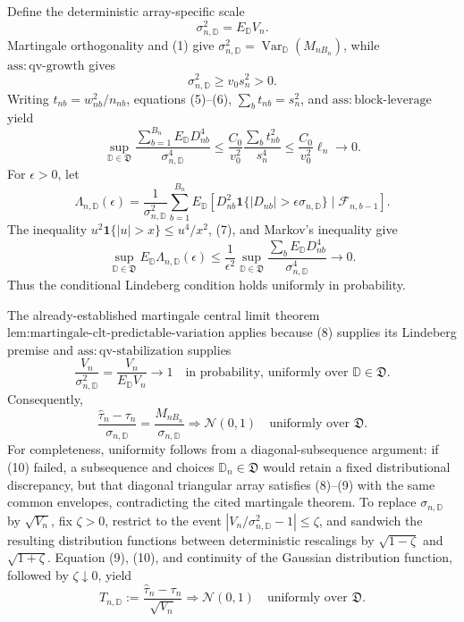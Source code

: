 Define the deterministic array-specific scale
\[
\sigma_{n,\mathbb D}^2=E_{\mathbb D}V_n.
\]
Martingale orthogonality and (1) give \(\sigma_{n,\mathbb D}^2=\operatorname{Var}_{\mathbb D}(M_{nB_n})\), while \(\mathrm{ass:qv\text{-}growth}\) gives
\[
\sigma_{n,\mathbb D}^2\ge v_0s_n^2>0. \tag{6}
\]
Writing \(t_{nb}=w_{nb}^2/n_{nb}\), equations (5)--(6), \(\sum_bt_{nb}=s_n^2\), and \(\mathrm{ass:block\text{-}leverage}\) yield
\[
\sup_{\mathbb D\in\mathfrak D}
\frac{\sum_{b=1}^{B_n}E_{\mathbb D}D_{nb}^4}{\sigma_{n,\mathbb D}^4}
\le\frac{C_0}{v_0^2}
\frac{\sum_bt_{nb}^2}{s_n^4}
\le\frac{C_0}{v_0^2}\ell_n\longrightarrow0. \tag{7}
\]
For \(\epsilon>0\), let
\[
\Lambda_{n,\mathbb D}(\epsilon)
=\frac1{\sigma_{n,\mathbb D}^2}\sum_{b=1}^{B_n}
E_{\mathbb D}\left[D_{nb}^2\mathbf 1\{|D_{nb}|>\epsilon\sigma_{n,\mathbb D}\}
\mid\mathcal F_{n,b-1}\right].
\]
The inequality \(u^2\mathbf 1\{|u|>x\}\le u^4/x^2\), (7), and Markov's inequality give
\[
\sup_{\mathbb D\in\mathfrak D}E_{\mathbb D}\Lambda_{n,\mathbb D}(\epsilon)
\le\frac1{\epsilon^2}
\sup_{\mathbb D\in\mathfrak D}
\frac{\sum_bE_{\mathbb D}D_{nb}^4}{\sigma_{n,\mathbb D}^4}
\longrightarrow0. \tag{8}
\]
Thus the conditional Lindeberg condition holds uniformly in probability.

The already-established martingale central limit theorem \(\text{lem:martingale-clt-predictable-variation}\) applies because (8) supplies its Lindeberg premise and \(\mathrm{ass:qv\text{-}stabilization}\) supplies
\[
\frac{V_n}{\sigma_{n,\mathbb D}^2}
=\frac{V_n}{E_{\mathbb D}V_n}\longrightarrow1
\quad\text{in probability, uniformly over }\mathbb D\in\mathfrak D. \tag{9}
\]
Consequently,
\[
\frac{\widehat\tau_n-\tau_n}{\sigma_{n,\mathbb D}}
=\frac{M_{nB_n}}{\sigma_{n,\mathbb D}}
\Rightarrow\mathcal N(0,1)
\quad\text{uniformly over }\mathfrak D. \tag{10}
\]
For completeness, uniformity follows from a diagonal-subsequence argument: if (10) failed, a subsequence and choices \(\mathbb D_n\in\mathfrak D\) would retain a fixed distributional discrepancy, but that diagonal triangular array satisfies (8)--(9) with the same common envelopes, contradicting the cited martingale theorem. To replace \(\sigma_{n,\mathbb D}\) by \(\sqrt{V_n}\), fix \(\zeta>0\), restrict to the event \(|V_n/\sigma_{n,\mathbb D}^2-1|\le\zeta\), and sandwich the resulting distribution functions between deterministic rescalings by \(\sqrt{1-\zeta}\) and \(\sqrt{1+\zeta}\). Equation (9), (10), and continuity of the Gaussian distribution function, followed by \(\zeta\downarrow0\), yield
\[
T_{n,\mathbb D}:=\frac{\widehat\tau_n-\tau_n}{\sqrt{V_n}}
\Rightarrow\mathcal N(0,1)
\quad\text{uniformly over }\mathfrak D. \tag{11}
\]

